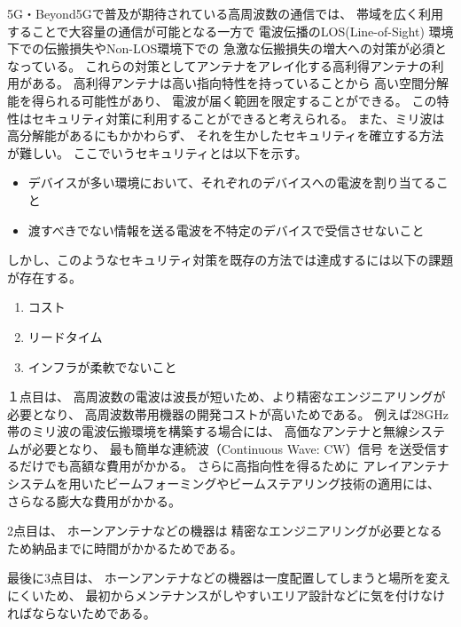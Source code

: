 \documentclass[technicalreport]{ieicej}
\begin{document}
5G・Beyond5Gで普及が期待されている高周波数の通信では、
帯域を広く利用することで大容量の通信が可能となる一方で
電波伝播のLOS(Line-of-Sight)
環境下での伝搬損失やNon-LOS環境下での
急激な伝搬損失の増大への対策が必須となっている。
これらの対策としてアンテナをアレイ化する高利得アンテナの利用がある。
高利得アンテナは高い指向特性を持っていることから
高い空間分解能を得られる可能性があり、
電波が届く範囲を限定することができる。
この特性はセキュリティ対策に利用することができると考えられる。
また、ミリ波は高分解能があるにもかかわらず、
それを生かしたセキュリティを確立する方法が難しい。
ここでいうセキュリティとは以下を示す。

\begin{itemize}
  \item デバイスが多い環境において、それぞれのデバイスへの電波を割り当てること
  \item 渡すべきでない情報を送る電波を不特定のデバイスで受信させないこと
\end{itemize}

しかし、このようなセキュリティ対策を既存の方法では達成するには以下の課題が存在する。

\begin{enumerate}
  \item コスト
  \item リードタイム
  \item インフラが柔軟でないこと
\end{enumerate}

１点目は、
高周波数の電波は波長が短いため、より精密なエンジニアリングが必要となり、
高周波数帯用機器の開発コストが高いためである。
例えば28GHz帯のミリ波の電波伝搬環境を構築する場合には、
高価なアンテナと無線システムが必要となり、
最も簡単な連続波（Continuous Wave: CW）信号
を送受信するだけでも高額な費用がかかる\cite{zep}。
さらに高指向性を得るために
アレイアンテナシステムを用いたビームフォーミングやビームステアリング技術の適用には、
さらなる膨大な費用がかかる。

2点目は、
ホーンアンテナなどの機器は
精密なエンジニアリングが必要となるため納品までに時間がかかるためである。

最後に3点目は、
ホーンアンテナなどの機器は一度配置してしまうと場所を変えにくいため、
最初からメンテナンスがしやすいエリア設計などに気を付けなければならないためである。
\end{document}
